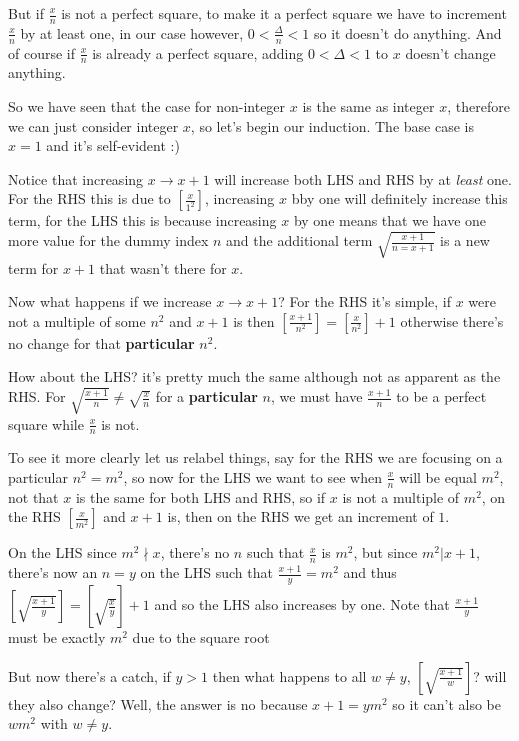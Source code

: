 \documentclass[aps,preprint,preprintnumbers,nofootinbib,showpacs,prd]{revtex4-1}
\begin{document}
But if $\frac{x}{n}$ is not a perfect square, to make it a perfect square we have to increment $\frac{x}{n}$ by at least one, in our case however, $0 < \frac{\Delta}{n} < 1$ so it doesn't do anything. And of course if $\frac{x}{n}$ is already a perfect square, adding $ 0< \Delta < 1$ to $x$ doesn't change anything.

So we have seen that the case for non-integer $x$ is the same as integer $x$, therefore we can just consider integer $x$, so let's begin our induction. The base case is $x = 1$ and it's self-evident :)

Notice that increasing $x \to x+1$ will increase both LHS and RHS by at {\it least} one. For the RHS this is due to $\left\lbrack\frac{x}{1^2}\right\rbrack$, increasing $x$ bby one will definitely increase this term, for the LHS this is because increasing $x$ by one means that we have one more value for the dummy index $n$ and the additional term $\sqrt{\frac{x+1}{n=x+1}}$ is a new term for $x+1$ that wasn't there for $x$.

Now what happens if we increase $x \to x+1$? For the RHS it's simple, if $x$ were not a multiple of some $n^2$ and $x+1$ is then $\left \lbrack \frac{x + 1}{n^2} \right \rbrack = \left \lbrack \frac{x}{n^2} \right \rbrack + 1$ otherwise there's no change for that {\bf particular} $n^2$.

How about the LHS? it's pretty much the same although not as apparent as the RHS. For $\sqrt{\frac{x+1}{n}} \neq \sqrt{\frac{x}{n}}$ for a {\bf particular} $n$, we must have $\frac{x+1}{n}$ to be a perfect square while $\frac{x}{n}$ is not.

To see it more clearly let us relabel things, say for the RHS we are focusing on a particular $n^2 = m^2$, so now for the LHS we want to see when $\frac{x}{n}$ will be equal $m^2$, not that $x$ is the same for both LHS and RHS, so if $x$ is not a multiple of $m^2$, on the RHS $\left \lbrack \frac{x}{m^2}\right\rbrack$ and $x+1$ is, then on the RHS we get an increment of $1$.

On the LHS since $m^2 \nmid x$, there's no $n$ such that $\frac{x}{n}$ is $m^2$, but since $m^2|x+1$, there's now an $n=y$ on the LHS such that $\frac{x+1}{y} = m^2$ and thus $\left \lbrack \sqrt{\frac{x+1}{y}} \right \rbrack = \left \lbrack \sqrt{\frac{x}{y}} \right \rbrack + 1$ and so the LHS also increases by one. Note that $\frac{x+1}{y}$ must be exactly $m^2$ due to the square root

But now there's a catch, if $y > 1$ then what happens to all $w \neq y$, $\left \lbrack \sqrt{\frac{x+1}{w}} \right \rbrack$? will they also change? Well, the answer is no because $x+1 = ym^2$ so it can't also be $wm^2$ with $w \neq y$.
\end{document}
